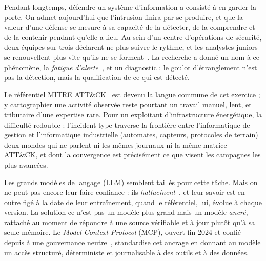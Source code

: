 
\label{chap:introduction}

Pendant longtemps, défendre un système d'information a consisté à en garder
la porte. On admet aujourd'hui que l'intrusion finira par se produire, et que la valeur d'une défense se mesure à sa capacité de la détecter, de la comprendre et de la contenir pendant qu'elle a lieu. Au sein d'un centre d'opérations de sécurité, deux équipes sur trois déclarent ne plus suivre le rythme, et les analystes juniors se renouvellent plus vite qu'ils ne se forment~\cite{sans2024}. La recherche a donné un nom à ce phénomène, la \emph{fatigue d'alerte}~\cite{tariq}, et un diagnostic : le
goulot d'étranglement n'est pas la détection, mais la qualification de ce
qui est détecté.

Le référentiel MITRE ATT\&CK~\cite{attack} est devenu la langue commune de cet
exercice ; y cartographier une activité observée reste pourtant un travail
manuel, lent, et tributaire d'une expertise rare. Pour un exploitant
d'infrastructure énergétique, la difficulté redouble : l'incident type
traverse la frontière entre l'informatique de gestion et l'informatique
industrielle (automates, capteurs, protocoles de terrain) deux mondes
qui ne parlent ni les mêmes journaux ni la même matrice ATT\&CK, et dont la
convergence est précisément ce que visent les campagnes les plus avancées.

Les grands modèles de langage (LLM) semblent taillés pour cette tâche. Mais on ne
peut pas encore leur faire confiance : ils \emph{hallucinent}~\cite{ji}, et leur savoir est
en outre figé à la date de leur entraînement, quand le référentiel, lui,
évolue à chaque version. La solution ce n'est pas un modèle plus grand mais un
modèle \emph{ancré}, rattaché au moment de répondre à une source vérifiable et
à jour plutôt qu'à sa seule mémoire. Le \emph{Model Context Protocol} (MCP),
ouvert fin 2024 et confié depuis à une gouvernance
neutre~\cite{mcpintro,aaif}, standardise cet ancrage en donnant au modèle un
accès structuré, déterministe et journalisable à des outils et à des données.

